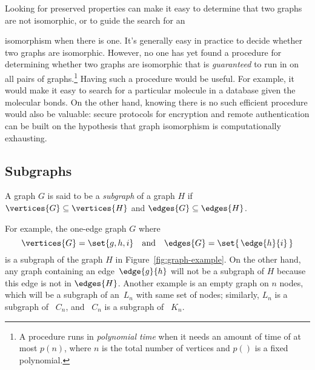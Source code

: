 Looking for preserved properties can make it easy to determine that two
graphs are not isomorphic, or to guide the search for an
\begin{editingnotes}
\end{editingnotes}
isomorphism when there is one.  It's generally easy in practice to decide
whether two graphs are isomorphic.  However, no one has yet found a
procedure for determining whether two graphs are isomorphic that is
\emph{guaranteed} to run in  on all pairs of
graphs.\footnote{\begin{editingnotes}
\end{editingnotes} A procedure runs in \emph{polynomial
    time} when it needs an amount of time of at most $ p(n)$, where $n$ is
  the total number of vertices and $p()$ is a fixed polynomial.}  Having
such a procedure would be useful.  For example, it would make it easy to
search for a particular molecule in a database given the molecular bonds.
On the other hand, knowing there is no such efficient procedure would also
be valuable: secure protocols for encryption and remote authentication can
be built on the hypothesis that graph isomorphism is computationally
exhausting.

\subsection{Subgraphs}

\begin{definition}\label{def:subgraph}
  A graph $G$ is said to be a \emph{subgraph} of a graph $H$ if
  $\vertices{G} \subseteq \vertices{H}$ and $\edges{G} \subseteq
  \edges{H}$.
\end{definition}

\begin{editingnotes}
\end{editingnotes}
For example, the one-edge graph $G$ where
\begin{equation*}
   \vertices{G} = \set{ g, h, i } \quad \text{and}\quad  \edges{G} =
   \set{\, \edge{h}{i} \, }
\end{equation*}
is a subgraph of the graph $H$ in Figure~\ref{fig:graph-example}.  On the
other hand, any graph containing an edge~$\edge{g}{h}$ will not be a
subgraph of $H$ because this edge is not in $\edges{H}$.  Another example
is an empty graph on $n$ nodes, which will be a subgraph of an~$L_n$ with
same set of nodes; similarly, $L_n$ is a subgraph of ~$C_n$, and ~$C_n$ is
a subgraph of ~$K_n$.

